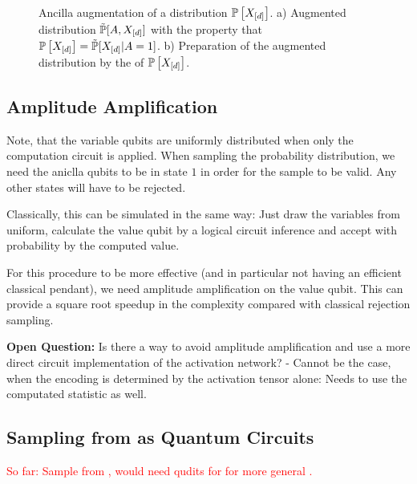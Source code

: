\documentclass[aps,onecolumn,nofootinbib,pra]{article}
\newcommand{\red}[1]{\textcolor{red}{#1}}
\begin{document}
    \begin{figure}
        \begin{center}
            
        \end{center}
        \caption{
            Ancilla augmentation of a distribution $\mathbb{P}\left[X_{[d]}\right]$.
            a) Augmented distribution $\tilde{\mathbb{P}}[A,X_{[d]}]$ with the property that $\mathbb{P}\left[X_{[d]}\right] = \tilde{\mathbb{P}}[X_{[d]}|A=1]$.
            b) Preparation of the augmented distribution by the \activationCircuit{} of $\mathbb{P}\left[X_{[d]}\right]$.
        }\label{fig:ancillaAugmentation}
    \end{figure}

    \subsection{Amplitude Amplification}

    Note, that the variable qubits are uniformly distributed when only the computation circuit is applied.
    When sampling the probability distribution, we need the aniclla qubits to be in state $1$ in order for the sample to be valid.
    Any other states will have to be rejected.

    Classically, this can be simulated in the same way:
    Just draw the variables from uniform, calculate the value qubit by a logical circuit inference and accept with probability by the computed value.

    For this procedure to be more effective (and in particular not having an efficient classical pendant), we need amplitude amplification on the value qubit.
    This can provide a square root speedup in the complexity compared with classical rejection sampling.

    \textbf{Open Question:} Is there a way to avoid amplitude amplification and use a more direct circuit implementation of the activation network?
    - Cannot be the case, when the encoding is determined by the activation tensor alone: Needs to use the computated statistic as well.


    \subsection{Sampling from \ComputationActivationNetworks{} as Quantum Circuits}

    \red{So far: Sample from \HybridLogicNetworks{}, would need qudits for for more general \ComputationActivationNetworks{}.}
\end{document}
